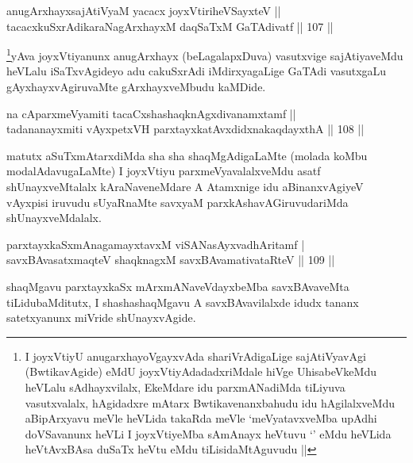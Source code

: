 \begin{shl}
anugArxhayxsajAtiVyaM yacacx joyxVtiriheVSayxteV ||  \\
tacacxkuSxrAdikaraNagArxhayxM daqSaTxM GaTAdivatf \hfill||  107 ||  
\end{shl}

\begin{artha}
\footnote{I joyxVtiyU anugarxhayoVgayxvAda shariVrAdigaLige sajAtiVyavAgi (BwtikavAgide) eMdU joyxVtiyAdadadxriMdale hiVge UhisabeVkeMdu heVLalu sAdhayxvilalx, EkeMdare idu parxmANadiMda tiLiyuva vasutxvalalx, hAgidadxre mAtarx Bwtikavenanxbahudu idu hAgilalxveMdu aBipArxyavu meVle heVLida takaRda meVle `meVyatavxveMba upAdhi doVSavanunx heVLi I joyxVtiyeMba sAmAnayx heVtuvu `\stext' eMdu heVLida heVtAvxBAsa duSaTx heVtu eMdu tiLisidaMtAguvudu ||}yAva joyxVtiyanunx anugArxhayx (beLagalapxDuva) vasutxvige sajAtiyaveMdu heVLalu iSaTxvAgideyo adu cakuSxrAdi iMdirxyagaLige GaTAdi vasutxgaLu gAyxhayxvAgiruvaMte gArxhayxveMbudu kaMDide.
\end{artha}

\begin{shl}
na cAparxmeVyamiti tacaCxshashaqknAgxdivanamxtamf ||  \\
tadananayxmiti vAyxpetxVH parxtayxkatAvxdidxnakaqdayxthA \hfill||  108 ||  
\end{shl}

\begin{artha}
matutx aSuTxmAtarxdiMda sha sha shaqMgAdigaLaMte (molada koMbu modalAdavugaLaMte) I joyxVtiyu parxmeVyavalalxveMdu asatf shUnayxveMtalalx kAraNaveneMdare A Atamxnige idu aBinanxvAgiyeV vAyxpisi iruvudu sUyaRnaMte savxyaM parxkAshavAGiruvudariMda shUnayxveMdalalx.
\end{artha}


\begin{shl}
parxtayxkaSxmAnagamayxtavxM viSANasAyxvadhAritamf | \\
savxBAvasatxmaqteV shaqknagxM savxBAvamativataRteV \hfill||  109 ||  
\end{shl}

\begin{artha}
shaqMgavu parxtayxkaSx mArxmANaveVdayxbeMba savxBAvaveMta tiLidubaMditutx, I shashashaqMgavu A savxBAvavilalxde idudx tananx satetxyanunx miVride shUnayxvAgide.
\end{artha}

